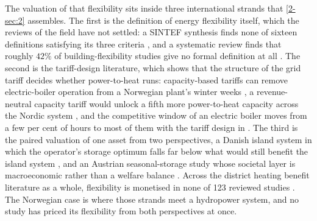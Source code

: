 The valuation of that flexibility sits inside three international strands that \autoref{2-sec:2} assembles. The first is the definition of energy flexibility itself, which the reviews of the field have not settled: a SINTEF synthesis finds none of sixteen definitions satisfying its three criteria \cite{degefa_comprehensive_2021}, and a systematic review finds that roughly $42\%$ of building-flexibility studies give no formal definition at all \cite{li_residential_2021}. The second is the tariff-design literature, which shows that the structure of the grid tariff decides whether power-to-heat runs: capacity-based tariffs can remove electric-boiler operation from a Norwegian plant's winter weeks \cite{kirkerud_impacts_2016}, a revenue-neutral capacity tariff would unlock a fifth more power-to-heat capacity across the Nordic system \cite{bergaentzle_cross-sector_2022}, and the competitive window of an electric boiler moves from a few per cent of hours to most of them with the tariff design in \cite{skytte_design_2017}. The third is the paired valuation of one asset from two perspectives, a Danish island system in which the operator's storage optimum falls far below what would still benefit the island system \cite{ostergaard_business_2019}, and an Austrian seasonal-storage study whose societal layer is macroeconomic rather than a welfare balance \cite{moser_socioeconomic_2018}. Across the district heating benefit literature as a whole, flexibility is monetised in none of 123 reviewed studies \cite{ahmed_district_2025}. The Norwegian case is where those strands meet a hydropower system, and no study has priced its flexibility from both perspectives at once.

